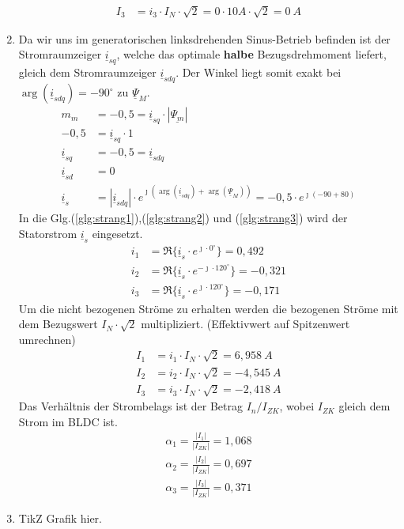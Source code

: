 \begin{solution}
\begin{enumerate}
\begin{align}
I_3 & = i_3 \cdot I_N \cdot \sqrt{2} =0 \cdot 10 A \cdot \sqrt{2} =0~A
\end{align}
\item Da wir uns im generatorischen linksdrehenden Sinus-Betrieb befinden ist der Stromraumzeiger $\underline{i}_{sq}$, welche das optimale \textbf{halbe} Bezugsdrehmoment liefert, gleich dem Stromraumzeiger $\underline{i}_{sdq}$. Der Winkel liegt somit exakt bei $\arg(\underline{i}_{sdq})=-90^\circ$ zu $\underline{\Psi}_M$.
\begin{align}
m_m &= -0,5 = \underline{i}_{sq} \cdot |\underline{\Psi_m}|\\
-0,5 &= \underline{i}_{sq} \cdot 1\\
\underline{i}_{sq} &= -0,5 = \underline{i}_{sdq} \\
\underline{i}_{sd} &= 0\\
\underline{i}_{s} &= |\underline{i}_{sdq}| \cdot e^{\jmath (\arg(\underline{i}_{sdq}) + \arg(\underline{\Psi}_{M}))}= -0,5 \cdot e^{\jmath (-90 + 80)}
\end{align}
In die Glg.(\ref{glg:strang1}),(\ref{glg:strang2}) und (\ref{glg:strang3}) wird der Statorstrom $\underline{i}_s$ eingesetzt.
\begin{align}
i_1 & = \Re \{ \underline{i}_s \cdot e^{\jmath \cdot 0 ^\circ} \} = 0,492\\
i_2 & = \Re \{ \underline{i}_s \cdot e^{-\jmath \cdot 120 ^\circ} \} = -0,321 \\
i_3 & = \Re \{ \underline{i}_s \cdot e^{\jmath \cdot 120 ^\circ} \}=  -0,171
\end{align}
Um die nicht bezogenen Ströme zu erhalten werden die bezogenen Ströme mit dem Bezugswert $I_N \cdot \sqrt{2}$ multipliziert. (Effektivwert auf Spitzenwert umrechnen)
\begin{align}
I_1 & = i_1 \cdot I_N \cdot \sqrt{2}  =6,958~A \\
I_2 & = i_2 \cdot I_N \cdot \sqrt{2} =-4,545~A \\
I_3 & = i_3 \cdot I_N \cdot \sqrt{2} =-2,418~A
\end{align}
Das Verhältnis der Strombelags ist der Betrag $I_n/ I_{ZK}$, wobei $I_{ZK}$ gleich dem Strom im BLDC ist.
\begin{align}
\alpha_1 = \frac{|I_1|}{|I_{ZK}|}= 1,068\\
\alpha_2 = \frac{|I_2|}{|I_{ZK}|}= 0,697\\
\alpha_3 = \frac{|I_3|}{|I_{ZK}|}= 0,371
\end{align}
\item TikZ Grafik hier.

\end{enumerate}
\end{solution}
